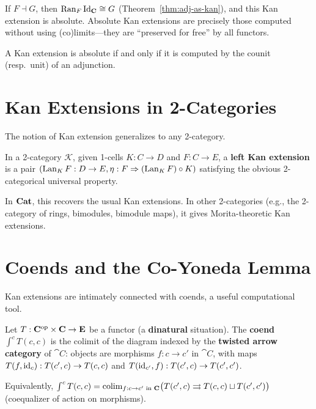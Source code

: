 \begin{example}
If $F \dashv G$, then $\operatorname{Ran}_F \mathrm{Id}_{\mathbf{C}} \cong G$ (Theorem~\ref{thm:adj-as-kan}), and this Kan extension is absolute. Absolute Kan extensions are precisely those computed without using (co)limits—they are ``preserved for free'' by all functors.
\end{example}

\begin{theorem}
A Kan extension is absolute if and only if it is computed by the counit (resp.\ unit) of an adjunction.
\end{theorem}

\section{Kan Extensions in 2-Categories}

The notion of Kan extension generalizes to any 2-category.

\begin{definition}
In a 2-category $\mathcal{K}$, given 1-cells $K: C \to D$ and $F: C \to E$, a \textbf{left Kan extension} is a pair $(\operatorname{Lan}_K F: D \to E, \eta: F \Rightarrow (\operatorname{Lan}_K F) \circ K)$ satisfying the obvious 2-categorical universal property.
\end{definition}

In $\mathbf{Cat}$, this recovers the usual Kan extensions. In other 2-categories (e.g., the 2-category of rings, bimodules, bimodule maps), it gives Morita-theoretic Kan extensions.

\section{Coends and the Co-Yoneda Lemma}

Kan extensions are intimately connected with coends, a useful computational tool.

\begin{definition}[Coend]
Let $T: \mathbf{C}^{\mathrm{op}} \times \mathbf{C} \to \mathbf{E}$ be a functor (a \textbf{dinatural} situation). The \textbf{coend} $\int^c T(c,c)$ is the colimit of the diagram indexed by the \textbf{twisted arrow category} of $\cat{C}$: objects are morphisms $f: c \to c'$ in $\cat{C}$, with maps $T(f, \mathrm{id}_c): T(c',c) \to T(c,c)$ and $T(\mathrm{id}_{c'}, f): T(c',c) \to T(c',c')$.

Equivalently, $\int^c T(c,c) = \operatorname{colim}_{f: c \to c' \text{ in } \mathbf{C}} \bigl(T(c',c) \rightrightarrows T(c,c) \sqcup T(c',c')\bigr)$ (coequalizer of action on morphisms).
\end{definition}

